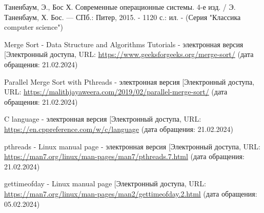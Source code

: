 \renewcommand\bibname{\centerline{СПИСОК ИСПОЛЬЗОВАННЫХ ИСТОЧНИКОВ}}

\begin{thebibliography}{3}
	\makeatletter
	\def\@biblabel#1{#1. }
	
	Таненбаум, Э., Бос Х. Современные операционные системы. 4-е изд. / Э. Таненбаум, Х. Бос. — СПб.: Питер, 2015. - 1120 с.: ил. - (Серия "Классика computer science")
	
	Merge Sort - Data Structure and Algorithms Tutorials - электронная версия [Электронный \text{ресурс]. -- Режим} доступа, URL: \url{https://www.geeksforgeeks.org/merge-sort/} (дата обращения: 21.02.2024)
	
	Parallel Merge Sort with Pthreads - электронная версия [Электронный \text{ресурс]. -- Режим} доступа, URL: \url{https://malithjayaweera.com/2019/02/parallel-merge-sort/} (дата обращения: 21.02.2024)
	
	C language - электронная версия [Электронный \text{ресурс]. -- Режим} доступа, URL: \url{https://en.cppreference.com/w/c/language} (дата обращения: 21.02.2024)
	
	pthreads - Linux manual page - электронная версия [Электронный \text{ресурс]. -- Режим} доступа, URL: \url{https://man7.org/linux/man-pages/man7/pthreads.7.html} (дата обращения: 21.02.2024)
	
	gettimeofday - Linux manual page [Электронный \text{ресурс]. -- Режим} доступа, URL: \url{https://man7.org/linux/man-pages/man2/gettimeofday.2.html} (дата обращения: 05.02.2024)
\end{thebibliography}